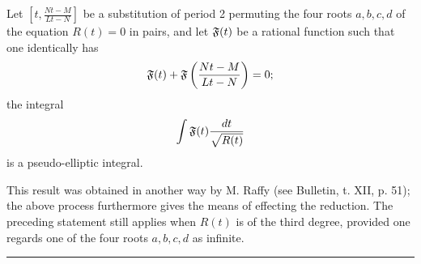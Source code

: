 \documentclass[11pt]{article}
\begin{document}
\begin{theorem}
Let $\left[t,\frac{Nt-M}{Lt-N}\right]$ be a substitution of period 2 permuting the four roots $a, b, c, d$ of the equation $R(t)=0$ in pairs, and let $\mathfrak{F}(t)$ be a rational function such that one identically has
\begin{equation*}
\mathfrak{F}(t)+\mathfrak{F}\left(\frac{Nt-M}{Lt-N}\right)=0;
\end{equation*}
the integral
\begin{equation*}
\int\mathfrak{F}(t)\frac{dt}{\sqrt{R(t)}}
\end{equation*}
is a pseudo-elliptic integral.
\end{theorem}
This result was obtained in another way by M. Raffy (see Bulletin, t. XII, p. 51); the above process furthermore gives the means of effecting the reduction. The preceding statement still applies when $R(t)$ is of the third degree, provided one regards one of the four roots $a, b, c, d$ as infinite.

\bigskip

\hrule
\end{document}
